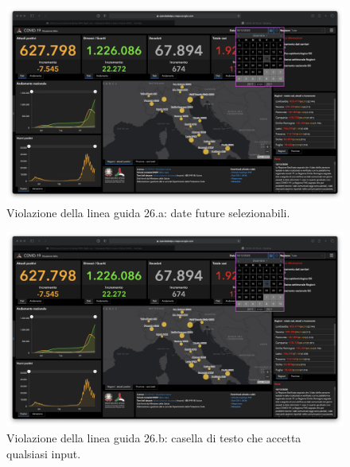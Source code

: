 \begin{enumerate}
\begin{enumerate}
            \begin{figure}[h]
                \centering
                \includegraphics[width=0.5\columnwidth]{../../../assets/images/verifica-risorse-esistenti/guidelines_violations_8.png}
                \caption{Violazione della linea guida 26.a: date future selezionabili.}
                \label{fig:guidelines-violations-8}
            \end{figure}
            \begin{figure}[h]
                \centering
                \includegraphics[width=0.5\columnwidth]{../../../assets/images/verifica-risorse-esistenti/guidelines_violations_8.png}
                \caption{Violazione della linea guida 26.b: casella di testo che accetta qualsiasi input.}
                \label{fig:guidelines-violations-9}
            \end{figure}
        \end{enumerate}
\end{enumerate}
